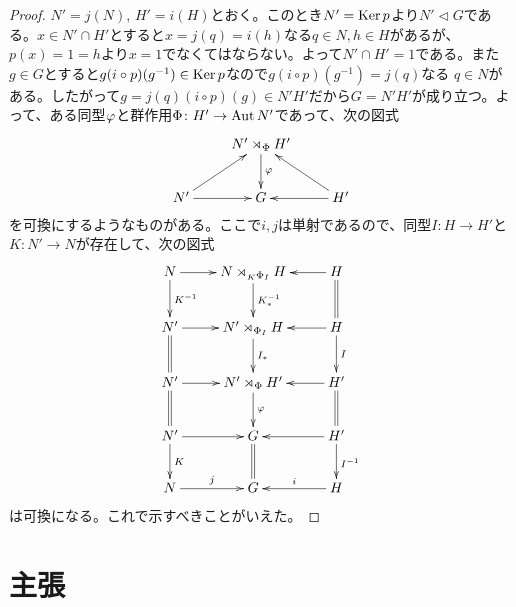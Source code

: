 \documentclass[10pt]{jsarticle}%
\begin{document}
\begin{proof}
  $N' = j(N)$, $H'=i(H)$とおく。このとき$N' = \operatorname{Ker} p$より$N' \lhd G$である。$x \in N' \cap H'$とすると$x = j(q) = i(h)$なる$q \in N, h \in H$があるが、$p(x) = 1 = h$より$x = 1$でなくてはならない。よって$N' \cap H' = 1$である。また$g \in G$とすると$g (i \circ p)(g^{-1}) \in \operatorname{Ker} p$なので$g (i \circ p)(g^{-1}) = j(q)$なる
  $q \in N$がある。したがって$g = j(q) (i \circ p)(g) \in N'H'$だから$G = N'H'$が成り立つ。よって、ある同型${\varphi}$と群作用$\Phi \colon H' \to \operatorname{Aut} N'$であって、次の図式
  \[
  \xymatrix{
  {} & N' \rtimes_{\Phi} H' \ar[d]^-{\vp} & {} \\
  N' \ar[ru] \ar[r] & G &  H' \ar[l] \ar[lu]
  }
  \]
  を可換にするようなものがある。ここで$i,j$は単射であるので、同型$I \colon H \to H'$と$K \colon N' \to N$が存在して、次の図式
  \[
  \xymatrix{
  N \ar[r] \ar[d]^-{K^{-1}} & N \rtimes_{ {}_K \Phi_I } H  \ar[d]^-{K_*^{-1}} & H \ar[l] \ar@{=}[d] \\
  N' \ar[r] \ar@{=}[d] & N' \rtimes_{\Phi_I } H  \ar[d]^-{I_*} & H \ar[l] \ar[d]^-{I} \\
  N' \ar[r] \ar@{=}[d] & N' \rtimes_{\Phi } H'  \ar[d]^-{\vp} & H' \ar[l] \ar@{=}[d] \\
  N' \ar[r] \ar[d]^-K & G  \ar@{=}[d] & H' \ar[l] \ar[d]^{I^{-1}} \\
  N \ar[r]^-j  & G   & H \ar[l]_-i
   }
  \]
  は可換になる。これで示すべきことがいえた。
\end{proof}

\newpage
\section*{主張}
\end{document}
